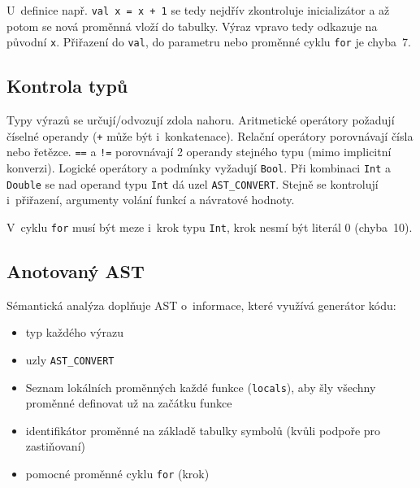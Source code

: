  U~definice např. \texttt{val x = x + 1} se tedy nejdřív zkontroluje inicializátor a až potom se nová proměnná vloží do tabulky.
  Výraz vpravo tedy odkazuje na původní \texttt{x}. Přiřazení do \texttt{val}, do parametru nebo proměnné cyklu \texttt{for} je chyba~7.

  \subsection{Kontrola typů}
  Typy výrazů se určují/odvozují zdola nahoru. Aritmetické operátory požadují číselné operandy (\texttt{+} může být i~konkatenace).
  Relační operátory porovnávají čísla nebo řetězce. \texttt{==} a \texttt{!=} porovnávají 2 operandy stejného typu (mimo implicitní konverzi).
  Logické operátory a podmínky vyžadují \texttt{Bool}. Při kombinaci \texttt{Int} a \texttt{Double} se nad operand typu \texttt{Int} dá uzel
  \texttt{AST\_CONVERT}. Stejně se kontrolují i~přiřazení, argumenty volání funkcí a návratové hodnoty.

  V~cyklu \texttt{for} musí být meze i~krok typu \texttt{Int}, krok nesmí být literál 0 (chyba~10).

  \subsection{Anotovaný AST}
  Sémantická analýza doplňuje AST o~informace, které využívá generátor kódu:
  \begin{itemize}
    \item typ každého výrazu
    \item uzly \texttt{AST\_CONVERT}
    \item Seznam lokálních proměnných každé funkce (\texttt{locals}), aby šly všechny proměnné definovat už na začátku funkce
    \item identifikátor proměnné na základě tabulky symbolů (kvůli podpoře pro zastiňovaní)
    \item pomocné proměnné cyklu \texttt{for} (krok)
  \end{itemize}

